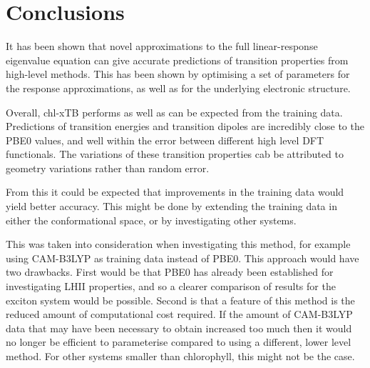 \section{Conclusions}
\label{sec:chl_conclusions}

It has been shown that novel approximations to the full linear-response eigenvalue
equation can give accurate predictions of transition properties from high-level methods.
This has been shown by optimising a set of parameters for the response approximations,
as well as for the underlying electronic structure.

Overall, chl-xTB performs as well as can be expected from the training data. Predictions
of transition energies and transition dipoles are incredibly close to the PBE0
values, and well within the error between different high level DFT functionals. 
The variations of these transition properties cab be attributed to geometry variations
rather than random error. 


From this it could be expected that improvements in the training data would yield 
better accuracy. This might be done by extending the training data in either the 
conformational space, or by investigating other systems. 

This was taken into consideration when investigating this method,
for example using CAM-B3LYP as training data instead of PBE0. This approach would
have two drawbacks. First would be that PBE0 has already been established for investigating
LHII properties, and so a clearer comparison of results for the exciton system would
be possible. Second is that a feature of this method is the reduced amount of 
computational cost required. If the amount of CAM-B3LYP data that may have been 
necessary to obtain increased too much then it would no longer be efficient to 
parameterise compared to using a different, lower level method. For other systems
smaller than chlorophyll, this might not be the case.
